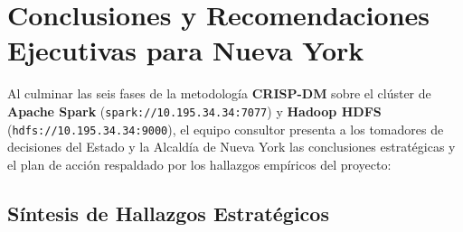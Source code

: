 \section{Conclusiones y Recomendaciones Ejecutivas para Nueva York}
\label{sec:conclusiones_recomendaciones}

Al culminar las seis fases de la metodología \textbf{CRISP-DM} sobre el clúster de \textbf{Apache Spark} (\texttt{spark://10.195.34.34:7077}) y \textbf{Hadoop HDFS} (\texttt{hdfs://10.195.34.34:9000}), el equipo consultor presenta a los tomadores de decisiones del Estado y la Alcaldía de Nueva York las conclusiones estratégicas y el plan de acción respaldado por los hallazgos empíricos del proyecto:

\subsection{Síntesis de Hallazgos Estratégicos}

